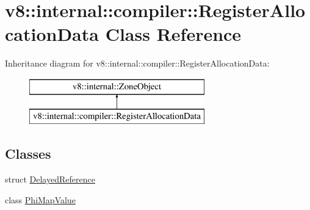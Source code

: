 \hypertarget{classv8_1_1internal_1_1compiler_1_1_register_allocation_data}{}\section{v8\+:\+:internal\+:\+:compiler\+:\+:Register\+Allocation\+Data Class Reference}
\label{classv8_1_1internal_1_1compiler_1_1_register_allocation_data}
Inheritance diagram for v8\+:\+:internal\+:\+:compiler\+:\+:Register\+Allocation\+Data\+:\begin{figure}[H]
\begin{center}
\leavevmode
\includegraphics[height=2.000000cm]{classv8_1_1internal_1_1compiler_1_1_register_allocation_data}
\end{center}
\end{figure}
\subsection*{Classes}
\begin{DoxyCompactItemize}
\item 
struct \hyperlink{structv8_1_1internal_1_1compiler_1_1_register_allocation_data_1_1_delayed_reference}{Delayed\+Reference}
\item 
class \hyperlink{classv8_1_1internal_1_1compiler_1_1_register_allocation_data_1_1_phi_map_value}{Phi\+Map\+Value}
\end{DoxyCompactItemize}
